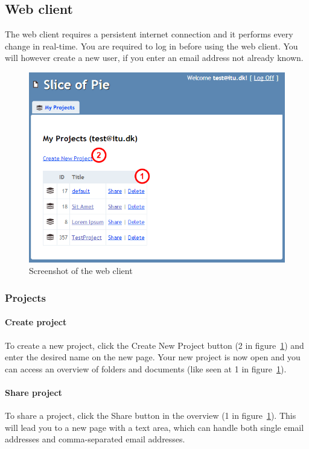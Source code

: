 \subsection{Web client}

The web client requires a persistent internet connection and it performs every change in real-time. You are required to log in before using the web client. You will however create a new user, if you enter an email address not already known.

\begin{figure}[htb]
	\centering
	\includegraphics[width=1\textwidth]{User_manual/graphics/web.png}
	\caption{Screenshot of the web client}
	\label{fig:manual-web}
\end{figure}

\subsubsection{Projects}

	\paragraph{Create project}
	To create a new project, click the Create New Project button (2 in figure~\ref{fig:manual-web}) and enter the desired name on the new page. Your new project is now open and you can access an overview of folders and documents (like seen at 1 in figure~\ref{fig:manual-web}).

	\paragraph{Share project}
	To share a project, click the Share button in the overview (1 in figure~\ref{fig:manual-web}). This will lead you to a new page with a text area, which can handle both single email addresses and comma-separated email addresses.
	
